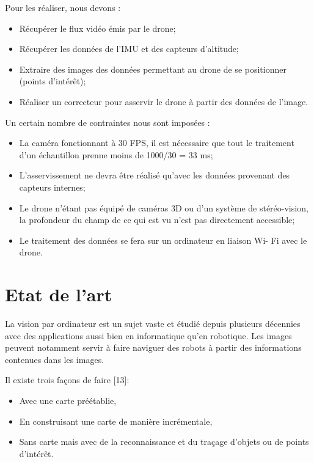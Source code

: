 \documentclass[10pt,a4paper]{report}
\begin{document}
		Pour les réaliser, nous devons :
		\begin{itemize}
		\item Récupérer le flux vidéo émis par le drone;
		\item Récupérer les données de l'IMU et des capteurs d'altitude;
		\item Extraire des images des données permettant au drone de se 						positionner (points d'intérêt);
		\item Réaliser un correcteur pour asservir le drone à partir des données 				de l'image.
		\end{itemize}
			
			
				
		Un certain nombre de contraintes nous sont imposées :
		
		\begin{itemize}
		\item La caméra fonctionnant à 30 FPS, il est nécessaire que tout le 					traitement d'un échantillon prenne moins de 1000/30 = 33 ms;
		\item L'asservissement ne devra être réalisé qu'avec les données 						provenant des capteurs internes;
		\item Le drone n'étant pas équipé de caméras 3D ou d'un système de 						stéréo-vision, la profondeur du champ de ce qui est vu n'est pas 					directement accessible;
		\item Le traitement des données se fera sur un ordinateur en liaison Wi-				Fi avec le drone.
		\end{itemize}
	
\newpage		
		
			
		
	
	
\section{Etat de l'art}
		

		La vision par ordinateur est un sujet vaste et étudié depuis plusieurs décennies avec des applications aussi bien en informatique qu'en robotique. Les images peuvent notamment servir à faire naviguer des robots à partir des informations contenues dans les images.\newline
		
		
	Il existe trois façons de faire [13]:
	
\begin{itemize}
\item Avec une carte préétablie,
\item En construisant une carte de manière incrémentale,
\item Sans carte mais avec de la reconnaissance et du traçage d'objets ou de points d'intérêt.\newline
\end{itemize}
\end{document}
